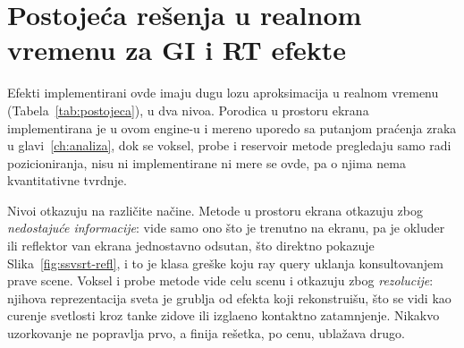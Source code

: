 \section{Postoje\'ca re\v{s}enja u realnom vremenu za GI i RT efekte}
\label{sec:postojeca}

Efekti implementirani ovde imaju dugu lozu aproksimacija u realnom vremenu
(Tabela~\ref{tab:postojeca}), u dva nivoa. Porodica u prostoru ekrana implementirana je u ovom engine-u i
mereno uporedo sa putanjom pra\'cenja zraka u glavi~\ref{ch:analiza}, dok se voksel, probe i reservoir metode
pregledaju samo radi pozicioniranja, nisu ni implementirane ni mere se ovde, pa o njima nema kvantitativne
tvrdnje.

Nivoi otkazuju na razli\v{c}ite na\v{c}ine. Metode u prostoru ekrana otkazuju zbog \emph{nedostaju\'ce informacije}:
vide samo ono \v{s}to je trenutno na ekranu, pa je okluder ili reflektor van ekrana jednostavno odsutan, \v{s}to
direktno pokazuje Slika~\ref{fig:ssvsrt-refl}, i to je klasa gre\v{s}ke koju ray query uklanja konsultovanjem
prave scene. Voksel i probe metode vide celu scenu i otkazuju zbog \emph{rezolucije}: njihova reprezentacija
sveta je grublja od efekta koji rekonstrui\v{s}u, \v{s}to se vidi kao curenje svetlosti kroz tanke zidove ili
izgla\dj eno kontaktno zatamnjenje. Nikakvo uzorkovanje ne popravlja prvo, a finija re\v{s}etka, po
cenu, ubla\v{z}ava drugo.

